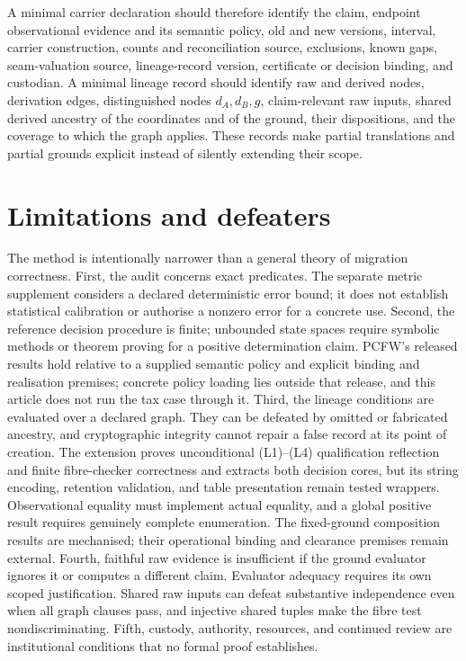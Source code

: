 \documentclass[smallextended,envcountsect,envcountsame,natbib]{svjour3}
\begin{document}
A minimal carrier declaration should therefore identify the claim, endpoint observational evidence and its semantic policy, old and new versions, interval, carrier construction, counts and reconciliation source, exclusions, known gaps, seam-valuation source, lineage-record version, certificate or decision binding, and custodian. A minimal lineage record should identify raw and derived nodes, derivation edges, distinguished nodes $d_A,d_B,g$, claim-relevant raw inputs, shared derived ancestry of the coordinates and of the ground, their dispositions, and the coverage to which the graph applies. These records make partial translations and partial grounds explicit instead of silently extending their scope.

\section{Limitations and defeaters}\label{ex:sec:limitations}
The method is intentionally narrower than a general theory of migration correctness. First, the audit concerns exact predicates. The separate metric supplement considers a declared deterministic error bound; it does not establish statistical calibration or authorise a nonzero error for a concrete use. Second, the reference decision procedure is finite; unbounded state spaces require symbolic methods or theorem proving for a positive determination claim. PCFW's released results hold relative to a supplied semantic policy and explicit binding and realisation premises; concrete policy loading lies outside that release, and this article does not run the tax case through it. Third, the lineage conditions are evaluated over a declared graph. They can be defeated by omitted or fabricated ancestry, and cryptographic integrity cannot repair a false record at its point of creation. The extension proves unconditional (L1)--(L4) qualification reflection and finite fibre-checker correctness and extracts both decision cores, but its string encoding, retention validation, and table presentation remain tested wrappers. Observational equality must implement actual equality, and a global positive result requires genuinely complete enumeration. The fixed-ground composition results are mechanised; their operational binding and clearance premises remain external. Fourth, faithful raw evidence is insufficient if the ground evaluator ignores it or computes a different claim. Evaluator adequacy requires its own scoped justification. Shared raw inputs can defeat substantive independence even when all graph clauses pass, and injective shared tuples make the fibre test nondiscriminating. Fifth, custody, authority, resources, and continued review are institutional conditions that no formal proof establishes.
\end{document}
